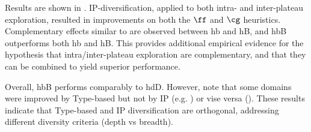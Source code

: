 


Results are shown in . IP-diversification, applied to both
intra- and inter-plateau exploration, resulted in improvements on both the $\ff$ and $\cg$ heuristics.
Complementary effects similar to  are observed between hb and hB, and  hbB outperforms both hb and hB.
This provides additional empirical evidence for the hypothesis that intra/inter-plateau exploration  are complementary, and that they can be combined to yield superior performance.

Overall, hbB performs comparably to hdD. However, note that some domains were improved by Type-based but not by IP (e.g. )
or vise versa ().
% 
% 
These results indicate that Type-based and IP diversification are orthogonal,
addressing different diversity criteria (depth vs breadth).
